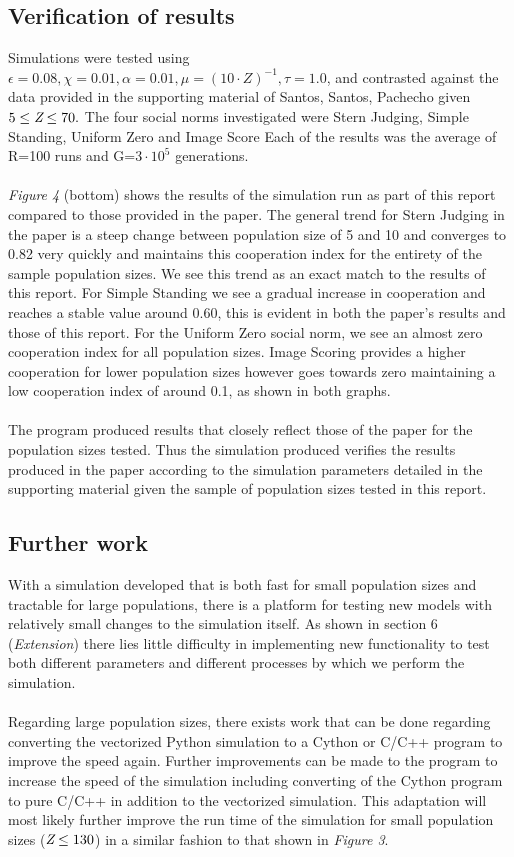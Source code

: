\documentclass[10pt,a4paper]{article}
\begin{document}
\subsection{Verification of results}
Simulations were tested using $\epsilon = 0.08, \chi = 0.01, \alpha = 0.01, \mu = (10 \cdot Z)^{-1}, \tau = 1.0$, and contrasted against the data provided in the supporting material of Santos, Santos, Pachecho given $ 5 \leq \emph{Z} \leq 70.$
The four social norms investigated were Stern Judging, Simple Standing, Uniform Zero and Image Score
Each of the results was the average of R=100 runs and G=$3 \cdot 10^{5}$ generations. 
\\\\
\textit{Figure 4} (bottom) shows the results of the simulation run as part of this report compared to those provided in the paper.
The general trend for Stern Judging in the paper is a steep change between population size of 5 and 10 and converges to 0.82 very quickly and maintains this cooperation index for the entirety of the sample population sizes.
We see this trend as an exact match to the results of this report.
For Simple Standing we see a gradual increase in cooperation and reaches a stable value around 0.60, this is evident in both the paper's results and those of this report.
For the Uniform Zero social norm, we see an almost zero cooperation index for all population sizes.
Image Scoring provides a higher cooperation for lower population sizes however goes towards zero maintaining a low cooperation index of around 0.1, as shown in both graphs.
\\\\
The program produced results that closely reflect those of the paper for the population sizes tested. 
Thus the simulation produced verifies the results produced in the paper according to the simulation parameters detailed in the supporting material given the sample of population sizes tested in this report.

\subsection{Further work}
With a simulation developed that is both fast for small population sizes and tractable for large populations, there is a platform for testing new models with relatively small changes to the simulation itself.
As shown in section 6 (\textit{Extension}) there lies little difficulty in implementing new functionality to test both different parameters and different processes by which we perform the simulation.
\\\\
Regarding large population sizes, there exists work that can be done regarding converting the vectorized Python simulation to a Cython or C/C++ program to improve the speed again.
Further improvements can be made to the program to increase the speed of the simulation including converting of the Cython program to pure C/C++ in addition to the vectorized simulation.
This adaptation will most likely further improve the run time of the simulation for small population sizes ($\emph{Z} \leq 130$) in a similar fashion to that shown in \textit{Figure 3}.
\end{document}
